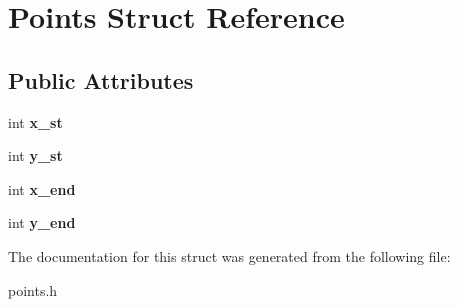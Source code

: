 \hypertarget{structPoints}{}\section{Points Struct Reference}
\label{structPoints}
\subsection*{Public Attributes}
\begin{DoxyCompactItemize}
\item 
int {\bfseries x\+\_\+st}\hypertarget{structPoints_af637214267177e5f4cfc85ec1d22ba95}{}\label{structPoints_af637214267177e5f4cfc85ec1d22ba95}

\item 
int {\bfseries y\+\_\+st}\hypertarget{structPoints_aa4537390af6f4b13509106d9af6134a5}{}\label{structPoints_aa4537390af6f4b13509106d9af6134a5}

\item 
int {\bfseries x\+\_\+end}\hypertarget{structPoints_a97a95c6259a28dc23ce6d2cc69f9b512}{}\label{structPoints_a97a95c6259a28dc23ce6d2cc69f9b512}

\item 
int {\bfseries y\+\_\+end}\hypertarget{structPoints_a980a673478f4dd5c46e41a9eaf61a998}{}\label{structPoints_a980a673478f4dd5c46e41a9eaf61a998}

\end{DoxyCompactItemize}


The documentation for this struct was generated from the following file\+:\begin{DoxyCompactItemize}
\item 
points.\+h\end{DoxyCompactItemize}
